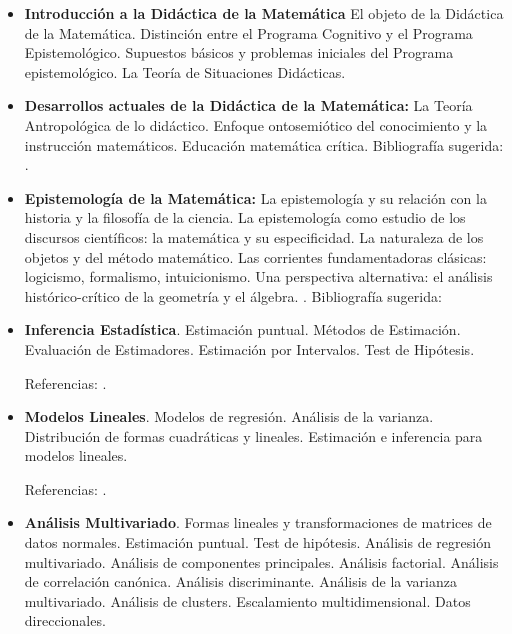 \documentclass[a4paper, 12pt]{article}
\begin{document}
\begin{enumerate}
\begin{itemize}
\item\textbf{Introducción a la Didáctica de la Matemática}
El objeto de la Didáctica de la Matemática. Distinción entre el Programa Cognitivo y el
Programa Epistemológico. Supuestos básicos y problemas iniciales del Programa
epistemológico. La Teoría de Situaciones Didácticas. \cite{Brousseau2007,Gascon2002,Gascon1998,Sadovsky2004}




\item\textbf{Desarrollos actuales de la Didáctica de la Matemática:}  La Teoría Antropológica de lo didáctico. Enfoque ontosemiótico del conocimiento y la instrucción matemáticos. Educación matemática crítica. Bibliografía sugerida: \cite{chevallard, Chevallard1999,Chevallard2001,Godino2017,Godino2007,Skovsmose1999,Skovsmose2012}.



\item\textbf{Epistemología de la Matemática:}
La epistemología y su relación con la historia y la filosofía de la ciencia. La epistemología como estudio de los discursos científicos: la matemática y su especificidad.  La naturaleza de los objetos y del método matemático. Las corrientes fundamentadoras clásicas: logicismo, formalismo, intuicionismo. Una perspectiva alternativa: el análisis histórico-crítico de la geometría y el álgebra.  
. Bibliografía sugerida: \cite{
klimo2,Barker1965,Gascon2001,Piaget1986,Pooper1956}







\item \textbf{Inferencia Estadística}.
Estimación puntual. Métodos de Estimación.
Evaluación de Estimadores.  Estimación por
Intervalos. Test de Hipótesis.

 

Referencias: \cite{bergero, bickel, degroot, lehmann,sen, rohatgi, scher}.



\item \textbf{Modelos Lineales}. Modelos de regresión. Análisis de la varianza. Distribución de formas cuadráticas y lineales. Estimación e inferencia para modelos lineales. 
 
 

 Referencias:  \cite{hock,  radrao, rawlyngs, scheffe, searle,  Venables, Montgonery}.
 
 
  

\item \textbf{Análisis Multivariado}. Formas lineales y transformaciones de matrices de datos normales. Estimación puntual. Test de hipótesis. Análisis de regresión multivariado. 
Análisis de componentes principales. Análisis factorial. Análisis de correlación canónica. Análisis discriminante. Análisis de la varianza multivariado. Análisis de clusters. Escalamiento multidimensional. Datos direccionales.


\end{itemize}
\end{enumerate}
\end{document}
